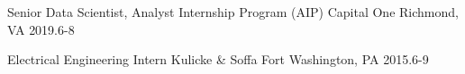 

\begin{cvhonors}

    \cvhonor
    {Senior Data Scientist, Analyst Internship Program (AIP)} %
    {Capital One} %
    {Richmond, VA} %
    {2019.6-8} %

    \cvhonor
    {Electrical Engineering Intern} %
    {Kulicke \& Soffa} %
    {Fort Washington, PA} %
    {2015.6-9} %
  
\end{cvhonors}
